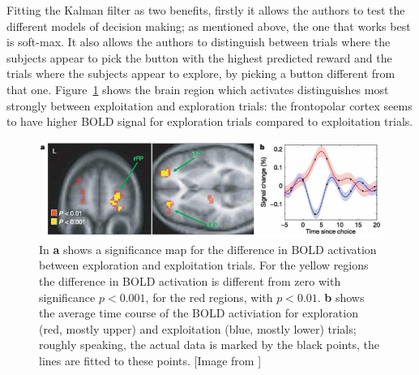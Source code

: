 \documentclass[12pt]{article}
\begin{document}
Fitting the Kalman filter as two benefits, firstly it allows the
authors to test the different models of decision making; as mentioned
above, the one that works best is soft-max. It also allows the authors
to distinguish between trials where the subjects appear to pick the
button with the highest predicted reward and the trials where the
subjects appear to explore, by picking a button different from that
one. Figure~\ref{fig_fmri_eve} shows the brain region which activates
distinguishes most strongly between exploitation and exploration
trials: the frontopolar cortex seems to have higher BOLD signal for exploration trials compared to exploitation trials.


\begin{figure}[htb]
\begin{center}
\includegraphics[width=12cm]{fig_fmri_eve.jpg}
\end{center}
\caption{In \textbf{a} shows a significance map for the difference in
  BOLD activation between exploration and exploitation trials. For the
  yellow regions the difference in BOLD activation is different from
  zero with significance $p<0.001$, for the red regions, with
  $p<0.01$. \textbf{b} shows the average time course of the BOLD
  activiation for exploration (red, mostly upper) and exploitation
  (blue, mostly lower) trials; roughly speaking, the actual data is
  marked by the black points, the lines are fitted to these
  points. [Image from \citep{DawEtAl2006}]\label{fig_fmri_eve}}
\end{figure}





 {}
\end{document}
